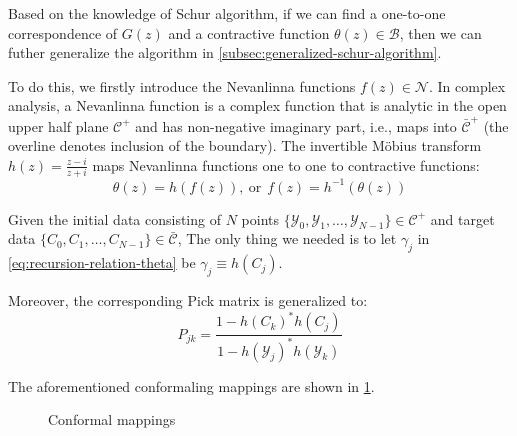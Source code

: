 \documentclass[
	preprint,%
	aps,
	prb,
	showpacs,	
	amsmath, amssymb]{revtex4-2}
\DeclareRobustCommand{\+}{\hstretch{1.25} {\boldsymbol {\mathrel{+}}}}
\newcommand{\Y}{ {\mathcal{Y}} }
\newcommand{\C}{ {\mathcal{C}} }
\newcommand{\Cbar}{ {\bar{\mathcal{C}}} }
\newcommand{\D}{ {\mathcal{D}} }
\newcommand{\Dbar}{ {\bar{\mathcal{D}}} }
\newcommand{\B}{ {\mathcal{B}} }
\newcommand{\N}{ {\mathcal{N}} }
\begin{document}
Based on the knowledge of Schur algorithm, if we can find 
a one-to-one correspondence of $G(z)$ and a contractive 
function $\theta(z) \in \B$, then we can futher generalize 
the algorithm in \cref{subsec:generalized-schur-algorithm}.

To do this, we firstly introduce the Nevanlinna functions $f(z) \in \N$.
In complex analysis, a Nevanlinna function is a complex
function that is analytic in the open upper half plane $\C^+$ and
has non-negative imaginary part, i.e., maps into $\Cbar^+$ (the
overline denotes inclusion of the boundary).
The invertible Möbius transform $h(z) = \frac{z-i}{z+i}$ 
maps Nevanlinna functions one to one to contractive
functions:
\begin{equation}\label{eq:f-theta-relation}
	\theta(z) = h(f(z)),\ \mathrm{or} \ \
	f(z) = h^{-1}(\theta(z))
\end{equation}

Given the initial data consisting of $N$ points 
$\{\Y_0, \Y_1, \dots ,\Y_{N-1}\} \in \C^+$ and target data
$\{C_0, C_1, \dots ,C_{N-1}\} \in \Cbar$, 
The only thing we needed is to let $\gamma_j$ in 
\cref{eq:recursion-relation-theta} be $\gamma_j \equiv h(C_j)$.

Moreover, the corresponding Pick matrix is generalized to:
\begin{equation}\label{eq:pick-matrix-nevanlinna}
	P_{jk} = \frac{1-h(C_k)^* h(C_j)}{1 - h(\Y_j)^* h(\Y_k)}
\end{equation}

The aforementioned conformaling mappings are shown in \cref{fig:conformal-map}.
\begin{figure}[htbp]
	\centering
	\begin{minipage}[t]{0.7\linewidth}
		\centering
	\end{minipage}
	\caption{Conformal mappings}
	\label{fig:conformal-map}
\end{figure}
\end{document}
